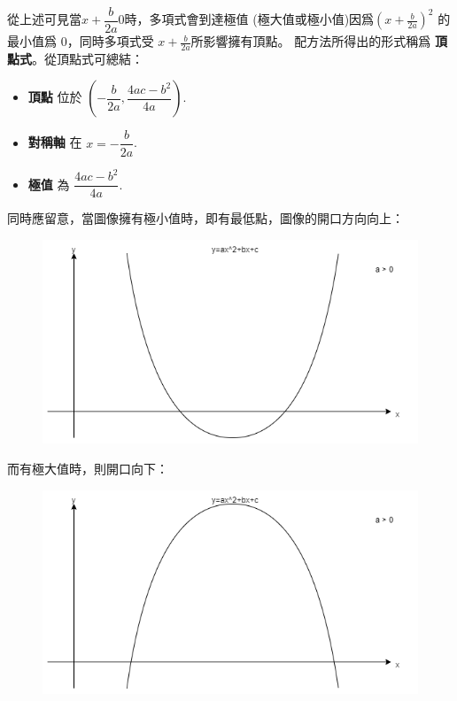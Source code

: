 \documentclass[12pt]{article}
\begin{document}
    從上述可見當$x+\dfrac{b}{2a}0$時，多項式會到達極值 (極大值或極小值)因爲$(x+\frac{b}{2a})^2$ 的最小值爲 0，同時多項式受 $x+\frac{b}{2a}$所影響擁有頂點。 配方法所得出的形式稱爲 \textbf{頂點式}。從頂點式可總結： \begin{itemize}
        \item \textbf{頂點} 位於 $(-\dfrac{b}{2a},\dfrac{4ac-b^2}{4a})$.
        \item \textbf{對稱軸} 在 $x=-\dfrac{b}{2a}$.
        \item \textbf{極值} 為 $\dfrac{4ac-b^2}{4a}$.
    \end{itemize}

    同時應留意，當圖像擁有極小值時，即有最低點，圖像的開口方向向上：

    \begin{figure}[H]
        \centering
        \includegraphics[scale=0.6]{open_upward.png}
    \end{figure}

    而有極大值時，則開口向下：

    \begin{figure}[H]
        \centering
        \includegraphics[scale=0.6]{open_downward.png}
    \end{figure}
\end{document}
